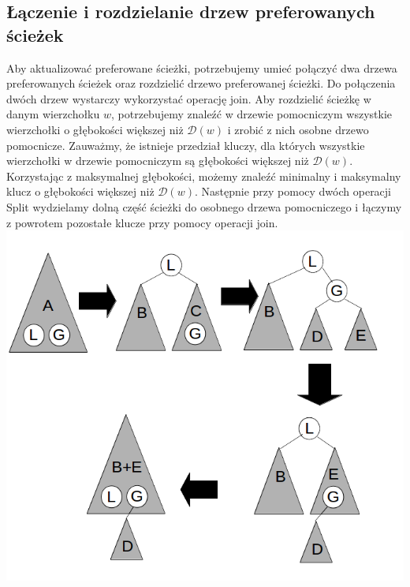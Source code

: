 \documentclass[declaration,shortabstract]{iithesis}
\theoremstyle{thm}
\theoremstyle{remark}
\theoremstyle{plain}
\theoremstyle{plain}
\theoremstyle{plain}
\begin{document}
\subsection{Łączenie i rozdzielanie drzew preferowanych ścieżek} 
Aby aktualizować preferowane ścieżki, potrzebujemy umieć połączyć dwa drzewa preferowanych ścieżek oraz rozdzielić drzewo preferowanej ścieżki. Do połączenia dwóch drzew wystarczy wykorzystać operację join. Aby rozdzielić ścieżkę w danym wierzchołku $w$, potrzebujemy znaleźć w drzewie pomocniczym wszystkie wierzchołki o głębokości większej niż \(\mathcal{D}(w)\) i zrobić z nich osobne drzewo pomocnicze. Zauważmy, że istnieje przedział kluczy, dla których wszystkie wierzchołki w drzewie pomocniczym są głębokości większej niż \(\mathcal{D}(w)\). Korzystając z maksymalnej głębokości, możemy znaleźć minimalny i maksymalny klucz o głębokości większej niż \(\mathcal{D}(w)\). Następnie przy pomocy dwóch operacji Split wydzielamy dolną część ścieżki do osobnego drzewa pomocniczego i łączymy z powrotem pozostałe klucze przy pomocy operacji join.\\ 
\includegraphics[scale=0.5]{rozdzielanie.png} 
\end{document}
